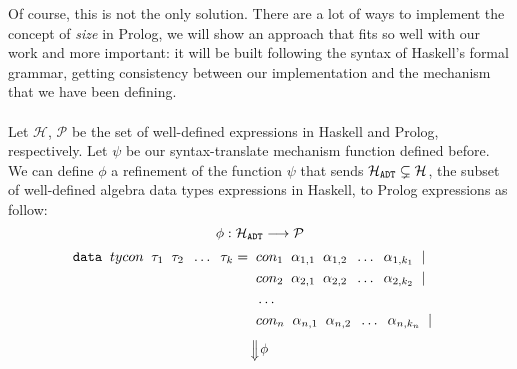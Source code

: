 Of course, this is not the only solution. There are a lot of ways to implement the concept of \textit{size} in Prolog, we will show an approach that fits so well with our work and more important: it will be built following the syntax of Haskell's formal grammar, getting consistency between our implementation and the mechanism that we have been defining.\\\\
Let $\mathcal{H}$, $\mathcal{P}$ be the set of well-defined expressions in Haskell and Prolog, respectively. Let $\psi$ be our syntax-translate mechanism function defined before. We can define $\phi$ a refinement of the function $\psi$ that sends $\mathcal{H}_{\texttt{ADT}} \subsetneq \mathcal{H}$, the subset of well-defined algebra data types expressions in Haskell, to Prolog expressions as follow: $$\phi: \mathcal{H}_{\texttt{ADT}} \longrightarrow \mathcal{P} $$
\begin{align*}
	\texttt{data} \;\; tycon \;\; \tau_1 \;\; \tau_2 \;\; \ldots \;\; \tau_k 	= & \;\; con_1 \;\; \alpha_{1,1} \;\; \alpha_{1,2} \;\; \ldots \;\; \alpha_{1,k_1} \;\; | &   &   \\
	                                                                         & \;\; con_2 \;\; \alpha_{2,1} \;\; \alpha_{2,2} \;\; \ldots \;\; \alpha_{2,k_2} \;\; | &   &   \\
	                                                                         & \;\; \ldots \;\;                                                                      &   &   \\
	                                                                         & \;\; con_n \;\; \alpha_{n,1} \;\; \alpha_{n,2} \;\; \ldots \;\; \alpha_{n,k_n} \;\; | &   &   \\
\end{align*}
$$\SLongdownarrow \phi$$

